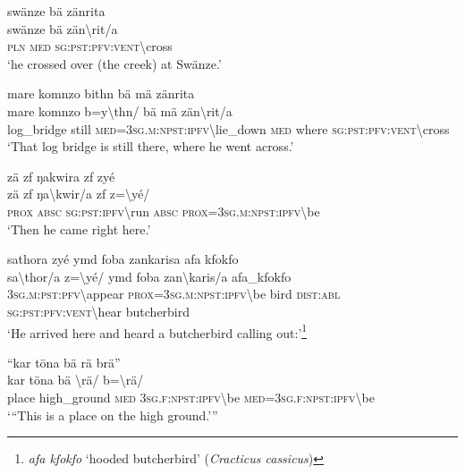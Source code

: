 \ea\label{ex:2:a1623}
swänze bä zänrita\\
\gll swänze	bä	zän{\textbackslash}rit/a\\
     \textsc{pln}	\textsc{med}	\textsc{sg}:\textsc{pst}:\textsc{pfv}:\textsc{vent}{\textbackslash}cross\\
\glt `he crossed over (the creek) at Swänze.'
\z

\ea\label{ex:2:a1624}
mare komnzo bithn bä mä zänrita\\
\gll mare	komnzo	b=y{\textbackslash}thn/	bä	mä	zän{\textbackslash}rit/a\\
     log\_bridge	still	\textsc{med}=3\textsc{sg}.\textsc{m}:\textsc{npst}:\textsc{ipfv}{\textbackslash}lie\_down	\textsc{med}	where	\textsc{sg}:\textsc{pst}:\textsc{pfv}:\textsc{vent}{\textbackslash}cross\\
\glt `That log bridge is still there, where he went across.'
\z

\ea\label{ex:2:a1626}
zä zf ŋakwira zf zyé\\
\gll zä	zf	ŋa{\textbackslash}kwir/a	zf	z={\textbackslash}yé/\\
     \textsc{prox}	\textsc{absc}	\textsc{sg}:\textsc{pst}:\textsc{ipfv}{\textbackslash}run	\textsc{absc}	\textsc{prox}=3\textsc{sg}.\textsc{m}:\textsc{npst}:\textsc{ipfv}{\textbackslash}be\\
\glt `Then he came right here.'
\z

\ea\label{ex:2:a1627}
sathora zyé ymd foba zankarisa afa kfokfo\\
\gll sa{\textbackslash}thor/a	z={\textbackslash}yé/	ymd	foba	zan{\textbackslash}karis/a	afa\_kfokfo\\
     3\textsc{sg}.\textsc{m}:\textsc{pst}:\textsc{pfv}{\textbackslash}appear	\textsc{prox}=3\textsc{sg}.\textsc{m}:\textsc{npst}:\textsc{ipfv}{\textbackslash}be	bird	\textsc{dist}:\textsc{abl}	\textsc{sg}:\textsc{pst}:\textsc{pfv}:\textsc{vent}{\textbackslash}hear	butcherbird\\
\glt `He arrived here and heard a butcherbird calling out:'\footnote{\textit{afa kfokfo} `hooded butcherbird' (\textit{Cracticus cassicus})}
\z

\ea\label{ex:2:a1628}
``kar töna bä rä brä''\\
\gll kar	töna	bä	{\textbackslash}rä/	b={\textbackslash}rä/\\
     place	high\_ground	\textsc{med}	3\textsc{sg}.\textsc{f}:\textsc{npst}:\textsc{ipfv}{\textbackslash}be	\textsc{med}=3\textsc{sg}.\textsc{f}:\textsc{npst}:\textsc{ipfv}{\textbackslash}be\\
\glt `{``}This is a place on the high ground.'''
\z

